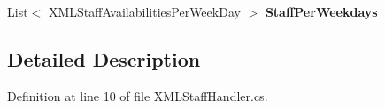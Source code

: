 \begin{DoxyCompactItemize}
\item 
List$<$ \hyperlink{class_general_health_care_elements_1_1_input_1_1_x_m_l_input_classes_1_1_x_m_l_staff_availabilities_per_week_day}{X\+M\+L\+Staff\+Availabilities\+Per\+Week\+Day} $>$ {\bfseries Staff\+Per\+Weekdays}\hypertarget{class_general_health_care_elements_1_1_input_1_1_x_m_l_input_classes_1_1_x_m_l_staff_handler_aacde0cd2a35e22fd596ef692c0790e4d}{}\label{class_general_health_care_elements_1_1_input_1_1_x_m_l_input_classes_1_1_x_m_l_staff_handler_aacde0cd2a35e22fd596ef692c0790e4d}

\end{DoxyCompactItemize}


\subsection{Detailed Description}


Definition at line 10 of file X\+M\+L\+Staff\+Handler.\+cs.

